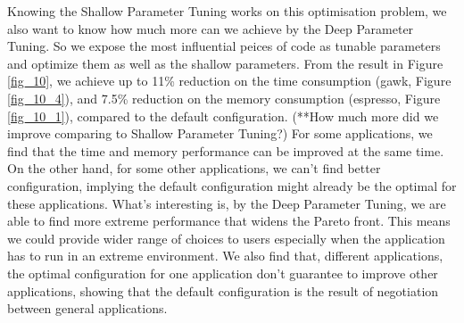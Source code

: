 Knowing the Shallow Parameter Tuning works on this optimisation problem, we also want to know how much more can we achieve by the Deep Parameter Tuning. So we expose the most influential peices of code as tunable parameters and optimize them as well as the shallow parameters. From the result in Figure \ref{fig_10}, we achieve up to 11\% reduction on the time consumption (gawk, Figure \ref{fig_10_4}), and 7.5\% reduction on the memory consumption (espresso, Figure \ref{fig_10_1}), compared to the default configuration. (**How much more did we improve comparing to Shallow Parameter Tuning?) For some applications, we find that the time and memory performance can be improved at the same time. On the other hand, for some other applications, we can't find better configuration, implying the default configuration might already be the optimal for these applications. What's interesting is, by the Deep Parameter Tuning, we are able to find more extreme performance that widens the Pareto front. This means we could provide wider range of choices to users especially when the application has to run in an extreme environment. We also find that, different applications, the optimal configuration for one application don't guarantee to improve other applications, showing that the default configuration is the result of negotiation between general applications.

